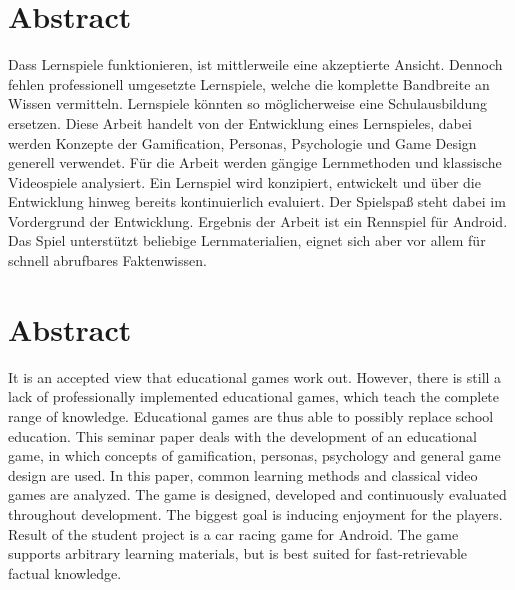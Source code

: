 \section*{Abstract}
Dass Lernspiele funktionieren, ist mittlerweile eine akzeptierte Ansicht. Dennoch fehlen professionell umgesetzte Lernspiele, welche die komplette Bandbreite an Wissen vermitteln. Lernspiele könnten so möglicherweise eine Schulausbildung ersetzen.
Diese Arbeit handelt von der Entwicklung eines Lernspieles, dabei werden Konzepte der Gamification, Personas, Psychologie und Game Design generell verwendet. Für die Arbeit werden gängige Lernmethoden und klassische Videospiele analysiert. Ein Lernspiel wird konzipiert, entwickelt und über die Entwicklung hinweg bereits kontinuierlich evaluiert. Der Spielspaß steht dabei im Vordergrund der Entwicklung.
Ergebnis der Arbeit ist ein Rennspiel für Android. Das Spiel unterstützt beliebige Lernmaterialien, eignet sich aber vor allem für schnell abrufbares Faktenwissen.

\vfill

\section*{Abstract}
It is an accepted view that educational games work out. However, there is still a lack of professionally implemented educational games, which teach the complete range of knowledge. Educational games are thus able to possibly replace school education.
This seminar paper deals with the development of an educational game, in which concepts of gamification, personas, psychology and general game design are used. In this paper, common learning methods and classical video games are analyzed. The game is designed, developed and continuously evaluated throughout development. The biggest goal is inducing enjoyment for the players.
Result of the student project is a car racing game for Android. The game supports arbitrary learning materials, but is best suited for fast-retrievable factual knowledge.

\vfill\vfill\newpage
